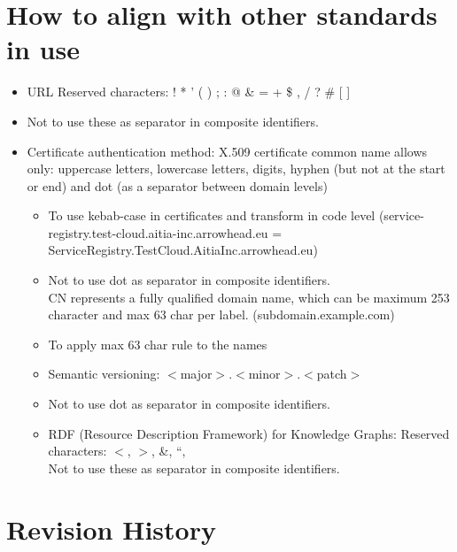\documentclass[a4paper]{arrowhead}
\begin{document}
\section{How to align with other standards in use}

\begin{itemize}

\item URL Reserved characters: ! * ' ( ) ; : @ \& = + \$ , / ? \# [ ] 
  
  
\item Not to use these as separator in composite identifiers.
 \item Certificate authentication method: X.509 certificate common name allows only: uppercase letters, lowercase letters, digits, hyphen (but not at the start or end) and dot (as a separator between domain levels)
   \begin{itemize}
   \item To use kebab-case in certificates and transform in code
     level (service-registry.test-cloud.aitia-inc.arrowhead.eu =
     ServiceRegistry.TestCloud.AitiaInc.arrowhead.eu) 
   \item Not to use dot as separator in composite identifiers.\\
     CN represents a fully qualified domain name, which can be maximum
     253 character and max 63 char per label.  (subdomain.example.com)
     
   \item To apply max 63 char rule to the names
   \item Semantic versioning: $<$major$>$.$<$minor$>$.$<$patch$>$
   \item Not to use dot as separator in composite identifiers.
   \item RDF (Resource Description Framework) for Knowledge Graphs: Reserved characters: $<$, $>$, \&, “, \\
     Not to use these as separator in composite identifiers.
   \end{itemize}
 \end{itemize}
 



\newpage

\section{Revision History}
\end{document}
